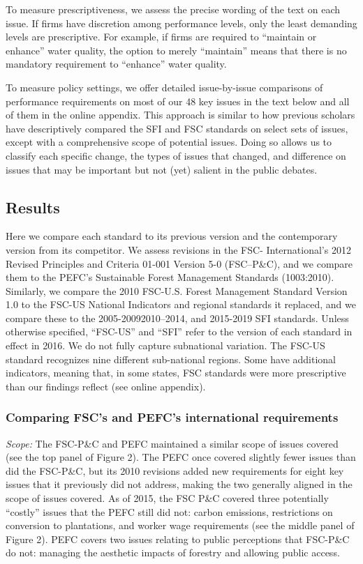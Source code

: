 \documentclass[
      12pt,
            Review ]{article}
\begin{document}
To measure prescriptiveness, we assess the precise wording of the text
on each issue. If firms have discretion among performance levels, only
the least demanding levels are prescriptive. For example, if firms are
required to ``maintain or enhance'' water quality, the option to merely
``maintain'' means that there is no mandatory requirement to ``enhance''
water quality.

To measure policy settings, we offer detailed issue-by-issue comparisons
of performance requirements on most of our 48 key issues in the text
below and all of them in the online appendix. This approach is similar
to how previous scholars have descriptively compared the SFI and FSC
standards on select sets of issues, except with a comprehensive scope of
potential issues. Doing so allows us to classify each specific change,
the types of issues that changed, and difference on issues that may be
important but not (yet) salient in the public debates.

\subsection{Results}\label{results}

Here we compare each standard to its previous version and the
contemporary version from its competitor. We assess revisions in the
FSC- International's 2012 Revised Principles and Criteria 01-001 Version
5-0 (FSC--P\&C), and we compare them to the PEFC's Sustainable Forest
Management Standards (1003:2010). Similarly, we compare the 2010
FSC-U.S. Forest Management Standard Version 1.0 to the FSC-US National
Indicators and regional standards it replaced, and we compare these to
the 2005-20092010--2014, and 2015-2019 SFI standards. Unless otherwise
specified, ``FSC-US'' and ``SFI'' refer to the version of each standard
in effect in 2016. We do not fully capture subnational variation. The
FSC-US standard recognizes nine different sub-national regions. Some
have additional indicators, meaning that, in some states, FSC standards
were more prescriptive than our findings reflect (see online appendix).

\subsubsection{Comparing FSC's and PEFC's international
requirements}\label{comparing-fscs-and-pefcs-international-requirements}

\emph{Scope:} The FSC-P\&C and PEFC maintained a similar scope of issues
covered (see the top panel of Figure 2). The PEFC once covered slightly
fewer issues than did the FSC-P\&C, but its 2010 revisions added new
requirements for eight key issues that it previously did not address,
making the two generally aligned in the scope of issues covered. As of
2015, the FSC P\&C covered three potentially ``costly'' issues that the
PEFC still did not: carbon emissions, restrictions on conversion to
plantations, and worker wage requirements (see the middle panel of
Figure 2). PEFC covers two issues relating to public perceptions that
FSC-P\&C do not: managing the aesthetic impacts of forestry and allowing
public access.
\end{document}

